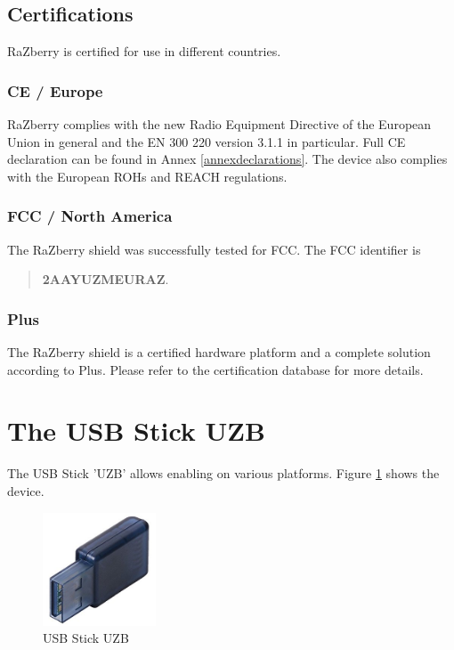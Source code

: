 \subsection{Certifications}

RaZberry is certified for use in different countries.

\subsubsection {CE / Europe}

RaZberry complies with the new Radio Equipment Directive of the European Union in general 
and the EN 300 220 version 3.1.1 in particular. Full CE declaration can be found in
Annex \ref{annexdeclarations}.
The device also complies with the European ROHs and REACH regulations.

\subsubsection {FCC / North America}

The RaZberry shield was successfully tested for FCC. The FCC identifier is

\begin{quote}
\textbf{2AAYUZMEURAZ}.
\end{quote}

\subsubsection {\zwave Plus}

The RaZberry shield is a certified hardware platform and a complete solution according to 
\zwave Plus. Please refer to the certification database 
 for more details.


\section{The USB Stick UZB}

The USB Stick 'UZB' allows enabling \zway on various platforms. Figure \ref{uzb} shows the device.

\begin{figure}
\begin{center}
\includegraphics[width=0.3\textwidth]{pngs/cap2/uzb.jpg}
\caption{USB Stick UZB}
\label{uzb}
\end{center}
\end{figure}

